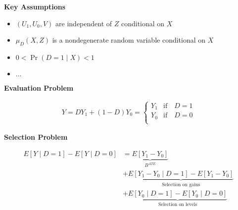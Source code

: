\begin{frame}\textbf{Key Assumptions}

\begin{itemize}\setlength\itemsep{1em}
\item $(U_1, U_0, V)$ are independent of $Z$ conditional on $X$
\item $\mu_D(X, Z)$ is a nondegenerate random variable conditional on $X$
\item $0 < \Pr(D=1 \mid X) < 1$
\item $\hdots$
\end{itemize}
\end{frame}
\begin{frame}\textbf{Evaluation Problem}\vspace{0.3cm}

\begin{align*}
Y = D Y_1 + (1 - D)Y_0 =
\begin{cases}
Y_{1} & \text{if}\quad D = 1 \\
Y_{0} & \text{if}\quad D = 0 \\
\end{cases}
\end{align*}\end{frame}
\begin{frame}\textbf{Selection Problem}\vspace{0.3cm}

\begin{align*}
E[Y\mid D = 1] - E[Y\mid D = 0] & = \underbrace{E[Y_1 - Y_0]}_{B^{ATE}} \\
	 							& + \underbrace{E[Y_1 - Y_0 \mid D = 1] - E[Y_1 - Y_0]}_{\text{Selection on gains}} \\
								& + \underbrace{E[Y_0\mid D = 1] - E[Y_0 \mid D = 0]}_{\text{Selection on levels}}
\end{align*}
\end{frame}
